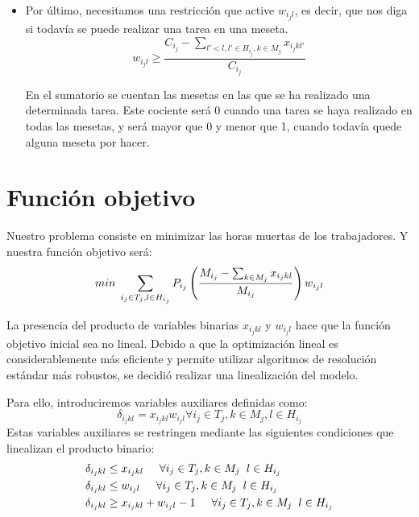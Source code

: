 \begin{itemize}
    \item  Por último, necesitamos una restricción que active $w_{i_j l}$, es decir, que nos diga si todavía se puede realizar una tarea en una meseta. 
        \[
	        \displaystyle w_{i_j l}\geq \frac{C_{i_j}-\sum_{l'<l, l'\in H_{i_j}, k\in M_j}x_{i_j kl'}}{C_{i_j}}
        \]
	
	    En el sumatorio se cuentan las mesetas en las que se ha realizado una determinada tarea. Este cociente será $0$ cuando una tarea se haya realizado en todas las mesetas, y será mayor que 0 y menor que 1, cuando todavía quede alguna meseta por hacer. 
	
\end{itemize}


\section*{Función objetivo}
Nuestro problema consiste en minimizar las horas muertas de los trabajadores. Y nuestra función objetivo será: 
	\[
	    min\hspace{0.1cm} \sum_{i_j \in T_j, l\in H_{i_j}}P_{i_j}\left(\frac{M_{i_j}-\sum_{k\in M_j}x_{i_j kl}}{M_{i_j}}\right)w_{i_j l}
    \]

    La presencia del producto de variables binarias $x_{i_j kl}$ y  $w_{i_j l}$ hace que la función objetivo inicial sea no lineal.
    Debido a que la optimización lineal es considerablemente más eficiente y permite utilizar algoritmos de resolución estándar más robustos,
    se decidió realizar una linealización del modelo.

    Para ello, introduciremos variables auxiliares definidas como:
    \[
        \delta_{i_j k l}=x_{i_j k l}w_{i_j l} \forall i_j \in T_j, k \in M_j, l \in H_{i_j}
    \]
    Estas variables auxiliares se restringen mediante las siguientes condiciones que linealizan el producto binario:
    \[\begin{aligned}
        \delta_{i_j k l} &\leq x_{i_j k l} \hspace{0.5cm} \forall i_j \in T_j, k \in M_j \hspace{0.2cm} l\in H_{i_j}\\
        \delta_{i_j k l} &\leq w_{i_j l} \hspace{0.5cm} \forall i_j \in T_j, k \in M_j \hspace{0.2cm} l\in H_{i_j}\\
	    \delta_{i_j k l} &\geq x_{i_j k l} + w_{i_j l} -1 \hspace{0.5cm} \forall i_j \in T_j, k \in M_j \hspace{0.2cm} l\in H_{i_j}
    \end{aligned}\]

